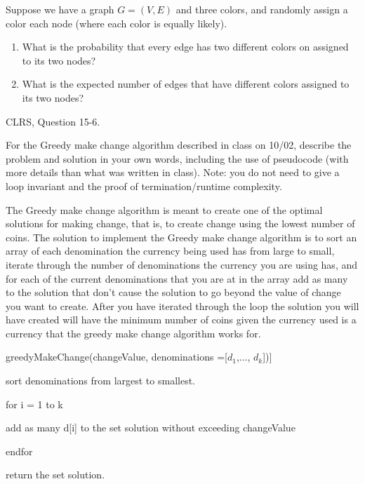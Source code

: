 \documentclass{article}
\begin{document}
   
\nextprob
Suppose we have a graph $G=(V,E)$ and three colors, and randomly assign a color
each node (where each color is equally likely).
\begin{enumerate}
    \item What is the probability that every edge has two different colors on
        assigned to its two nodes?
    \item What is the expected number of edges that have different colors
        assigned to its two nodes?
\end{enumerate}

\nextprob
CLRS, Question 15-6.

\nextprob
For the Greedy make change algorithm described in class on 10/02, describe the
problem and solution in your own words, including the use of pseudocode (with
more details than what was written in class).  Note: you do not need to give a
loop invariant and the proof of termination/runtime complexity.


The Greedy make change algorithm is meant to create one of the optimal solutions for making change, that is, to create change using the lowest number of coins. The solution to implement the Greedy make change algorithm is to sort an array of each denomination the currency being used has from large to small, iterate through the number of denominations the currency you are using has, and for each of the current denominations that you are at in the array add as many to the solution that don't cause the solution to go beyond the value of change you want to create. After you have iterated through the loop the solution you will have created will have the minimum number of coins given the currency used is a currency that the greedy make change algorithm works for. 


greedyMakeChange(changeValue, denominations ={[$d_1$,..., $d_k$]})]

sort denominations from largest to smallest.
 
for i = 1 to k

\quad 	add as many d{[i]} to the set solution without exceeding changeValue

endfor

return the set solution.
\end{document}
